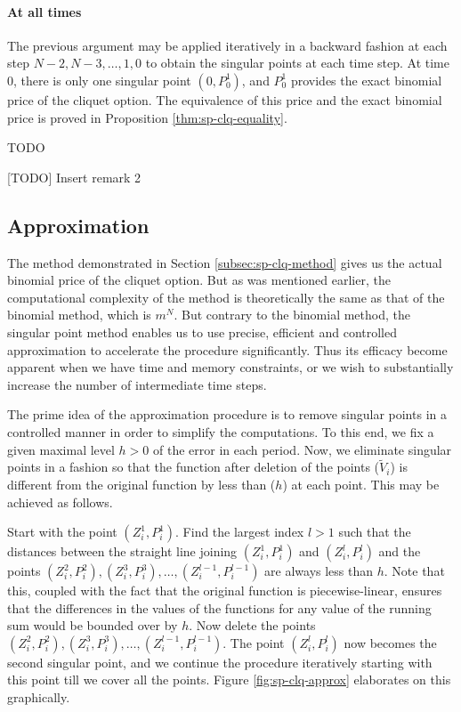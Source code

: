 \paragraph{At all times}
The previous argument may be applied iteratively in a backward fashion at each step $ N-2, N-3, \dots, 1, 0 $ to obtain the singular points at each time step. At time 0, there is only one singular point $ (0, P_0^1) $, and $ P_0^1 $ provides the exact binomial price of the cliquet option. The equivalence of this price and the exact binomial price is proved in Proposition \ref{thm:sp-clq-equality}.



\begin{prp}
	\label{thm:sp-clq-equality}
	TODO
\end{prp}


[TODO] Insert remark 2


\subsection{Approximation}

The method demonstrated in Section \ref{subsec:sp-clq-method} gives us the actual binomial price of the cliquet option. But as was mentioned earlier, the computational complexity of the method is theoretically the same as that of the binomial method, which is $ m^{N} $. But contrary to the binomial method, the singular point method enables us to use precise, efficient and controlled approximation to accelerate the procedure significantly. Thus its efficacy become apparent when we have time and memory constraints, or we wish to substantially increase the number of intermediate time steps.

The prime idea of the approximation procedure is to remove singular points in a controlled manner in order to simplify the computations. To this end, we fix a given maximal level $ h > 0 $ of the error in each period. Now, we eliminate singular points in a fashion so that the function after deletion of the points ($ \tilde{V}_i $) is different from the original function by less than ($ h $) at each point. This may be achieved as follows.

Start with the point $ ( Z_i^1, P_i^1 ) $. Find the largest index $ l > 1 $ such that the distances between the straight line joining $ ( Z_i^1, P_i^1 ) $ and $ ( Z_i^l, P_i^l ) $ and the points $ ( Z_i^2, P_i^2 ), ( Z_i^3, P_i^3 ), \dots, ( Z_i^{l-1}, P_i^{l-1} ) $ are always less than $ h $. Note that this, coupled with the fact that the original function is piecewise-linear, ensures that the differences in the values of the functions for any value of the running sum would be bounded over by $ h $. Now delete the points $ ( Z_i^2, P_i^2 ), ( Z_i^3, P_i^3 ), \dots, ( Z_i^{l-1}, P_i^{l-1} ) $. The point $ ( Z_i^l, P_i^l ) $ now becomes the second singular point, and we continue the procedure iteratively starting with this point till we cover all the points. Figure \ref{fig:sp-clq-approx} elaborates on this graphically.

